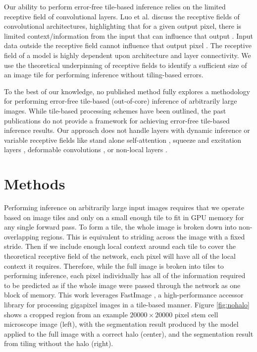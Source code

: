 \documentclass[10pt, indentfirst]{article}
\begin{document}
Our ability to perform error-free tile-based inference relies on the limited receptive field of convolutional layers. Luo et al. \citep{Luo2016} discuss the receptive fields of convolutional architectures, highlighting that for a given output pixel, there is limited context/information from the input that can influence that output \citep{araujo2019computing}. Input data outside the receptive field cannot influence that output pixel \citep{Luo2016}. The receptive field of a model is highly dependent upon architecture and layer connectivity. We use the theoretical underpinning of receptive fields to identify a sufficient size of an image tile for performing inference without tiling-based errors.  

To the best of our knowledge, no published method fully explores a methodology for performing error-free tile-based (out-of-core) inference of arbitrarily large images. While tile-based processing schemes have been outlined, the past publications do not provide a framework for achieving error-free tile-based inference results. Our approach does not handle layers with dynamic inference or variable receptive fields like stand alone self-attention \citep{Ramachandran2019b}, squeeze and excitation layers \citep{Hu2018}, deformable convolutions \citep{Dai2017}, or non-local layers \citep{Wang2018c}. 


\section{Methods}
\label{methods}

Performing inference on arbitrarily large input images requires that we operate based on image tiles and only on a small enough tile to fit in GPU memory for any single forward pass. To form a tile, the whole image is broken down into non-overlapping regions. This is equivalent to striding across the image with a fixed stride. Then if we include enough local context around each tile to cover the theoretical receptive field of the network, each pixel will have all of the local context it requires. Therefore, while the full image is broken into tiles to performing inference, each pixel individually has all of the information required to be predicted as if the whole image were passed through the network as one block of memory. 
This work leverages FastImage \citep{Bardakoff2019}, a high-performance accessor library for processing gigapixel images in a tile-based manner.
Figure \ref{fig:nohalo} shows a cropped region from an example $\num{20000} \times \num{20000}$ pixel stem cell microscope image (left), with the segmentation result produced by the model applied to the full image with a correct halo (center), and the segmentation result from tiling without the halo (right). 
\end{document}

